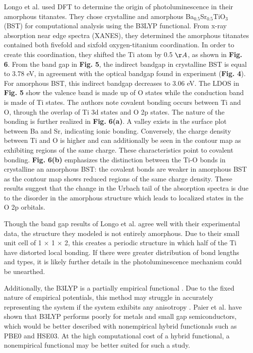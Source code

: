 \documentclass[3p,review,12pt]{elsarticle}
\begin{document}
Longo et al. \cite{Longo2004} used DFT to determine the origin of photoluminescence in their amorphous titanates. They chose  crystalline and amorphous Ba$_{0.5}$Sr$_{0.5}$TiO$_{3}$ (BST) for computational analysis using the B3LYP functional. From x-ray absorption near edge spectra (XANES), they determined the amorphous titanates contained both fivefold and sixfold oxygen-titanium coordination. In order to create this coordination, they shifted the Ti atom by 0.5 $\AA$, as shown in \textbf{Fig. 6}. From the band gap in \textbf{Fig. 5}, the indirect bandgap in crystalline BST is equal to 3.78 eV, in agreement with the optical bandgap found in experiment (\textbf{Fig. 4}). For amorphous BST, this indirect bandgap decreases to 3.06 eV. The LDOS in \textbf{Fig. 5} show the valence band is made up of O states while the conduction band is made of Ti states. The authors note covalent bonding occurs between Ti and O, through the overlap of Ti 3d states and O 2p states. The nature of the bonding is further realized in \textbf{Fig. 6(a)}. A  valley exists in the surface plot between Ba and Sr, indicating ionic bonding. Conversely, the charge density between Ti and O is higher and can additionally be seen in the contour map as exhibiting regions of the same charge. These characteristics point to covalent bonding.\textbf{ Fig. 6(b)} emphasizes the distinction between the Ti-O bonds in crystalline an amorphous BST: the covalent bonds are weaker in amorphous BST as the contour map shows reduced regions of the same charge density. These results suggest that the change in the Urbach tail of the absorption spectra is due to the disorder in the amorphous structure which leads to localized states in the O 2p orbitals.

\par

Though the band gap results of Longo et al. agree well with their experimental data, the structure they modeled is not entirely amorphous. Due to their small unit cell of 1 $\times$ 1 $\times$ 2, this creates a periodic structure in which half of the Ti have distorted local bonding. If there were greater distribution of bond lengths and types, it is likely further details in the photoluminescence mechanism could be unearthed.
\par

Additionally, the B3LYP is a partially empirical functional \cite{Paier2007}. Due to the fixed nature of empirical potentials, this method may struggle in accurately representing the system if the system exhibits any anisotropy \cite{Hohl1991}. Paier et al. \cite{Paier2007} have shown that B3LYP performs poorly for metals and small gap semiconductors, which would be better described with nonempirical hybrid functionals such as PBE0 and HSE03. At the high computational cost of a hybrid functional, a nonempirical functional may be better suited for such a study.
\end{document}
